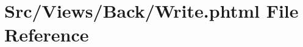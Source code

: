 \hypertarget{_write_8phtml}{}\section{Src/\+Views/\+Back/\+Write.phtml File Reference}
\label{_write_8phtml}
